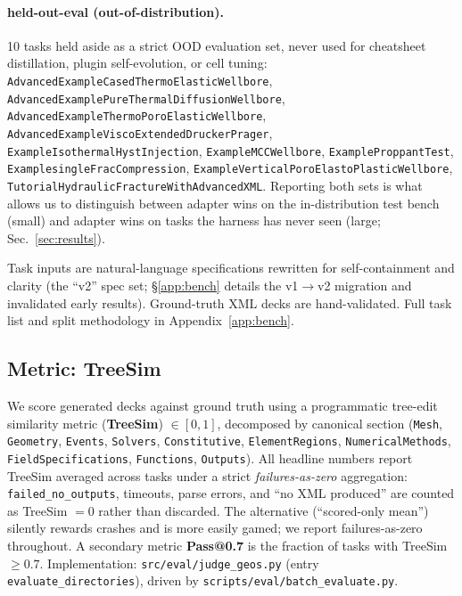 \documentclass{article}
\begin{document}
\paragraph{held-out-eval (out-of-distribution).}\label{subsec:held-out-set} 10 tasks held aside as a strict OOD evaluation set, never used for cheatsheet distillation, plugin self-evolution, or cell tuning: \texttt{AdvancedExampleCasedThermoElasticWellbore}, \texttt{AdvancedExamplePureThermalDiffusionWellbore}, \texttt{AdvancedExampleThermoPoroElasticWellbore}, \texttt{AdvancedExampleViscoExtendedDruckerPrager}, \texttt{ExampleIsothermalHystInjection}, \texttt{ExampleMCCWellbore}, \texttt{ExampleProppantTest}, \texttt{ExamplesingleFracCompression}, \texttt{ExampleVerticalPoroElastoPlasticWellbore}, \texttt{TutorialHydraulicFractureWithAdvancedXML}. Reporting both sets is what allows us to distinguish between adapter wins on the in-distribution test bench (small) and adapter wins on tasks the harness has never seen (large; Sec.~\ref{sec:results}).

Task inputs are natural-language specifications rewritten for self-containment and clarity (the ``v2'' spec set; \S\ref{app:bench} details the v1$\rightarrow$v2 migration and invalidated early results). Ground-truth XML decks are hand-validated. Full task list and split methodology in Appendix~\ref{app:bench}.

\subsection{Metric: TreeSim}
\label{subsec:metric}
We score generated decks against ground truth using a programmatic tree-edit similarity metric (\textbf{TreeSim}) $\in [0, 1]$, decomposed by canonical section (\texttt{Mesh}, \texttt{Geometry}, \texttt{Events}, \texttt{Solvers}, \texttt{Constitutive}, \texttt{ElementRegions}, \texttt{NumericalMethods}, \texttt{FieldSpecifications}, \texttt{Functions}, \texttt{Outputs}). All headline numbers report TreeSim averaged across tasks under a strict \emph{failures-as-zero} aggregation: \texttt{failed\_no\_outputs}, timeouts, parse errors, and ``no XML produced'' are counted as TreeSim $= 0$ rather than discarded. The alternative (``scored-only mean'') silently rewards crashes and is more easily gamed; we report failures-as-zero throughout. A secondary metric \textbf{Pass@0.7} is the fraction of tasks with TreeSim $\geq 0.7$. Implementation: \texttt{src/eval/judge\_geos.py} (entry \texttt{evaluate\_directories}), driven by \texttt{scripts/eval/batch\_evaluate.py}.
\end{document}
